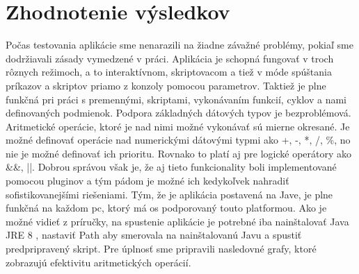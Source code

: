 \section{Zhodnotenie výsledkov}
\indent Počas testovania aplikácie sme nenarazili na žiadne závažné problémy, pokiaľ sme dodržiavali zásady vymedzené v práci. 
\newline
\indent Aplikácia je schopná fungovať v troch rôznych režimoch, a to interaktívnom, skriptovacom a tiež v móde spúštania príkazov a skriptov priamo z konzoly pomocou parametrov. Taktiež je plne funkčná pri práci s premennými, skriptami, vykonávaním funkcií, cyklov a nami definovaných podmienok.
\newline
\indent  Podpora základných dátových typov je bezproblémová. Aritmetické operácie, ktoré je nad nimi možné vykonávať sú mierne okresané. Je možné definovať  operácie nad numerickými dátovými typmi ako +, -, *, /, \%, no nie je možné definovať ich prioritu. Rovnako to platí aj pre logické operátory ako \&\&, ||. Dobrou správou však je, že aj tieto funkcionality boli implementované pomocou pluginov a tým pádom je možné ich kedykoľvek nahradiť sofistikovanejšími riešeniami. 
\newline
\indent Tým, že je aplikácia postavená na Jave, je plne funkčná na každom \acrshort{pc}, ktorý má \acrshort{os} podporovaný touto platformou. Ako je možné vidieť z príručky, na spustenie aplikácie je potrebné iba nainštalovať Java JRE 8 , nastaviť Path aby smerovala na nainštalovanú Javu a spustiť predpripravený skript. Pre úplnosť sme pripravili nasledovné grafy, ktoré zobrazujú efektivitu aritmetických operácií.
